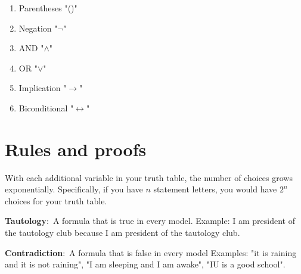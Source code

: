 \documentclass[nobib]{tufte-handout}
\newcommand{\defn}[2]{\noindent\textbf{#1}:\ #2}
\let\biconditional\leftrightarrow
\begin{document}
\begin{enumerate}
    \item Parentheses "()"
    \item Negation "$\neg$"
    \item AND "$\land$"
    \item OR "$\lor$"
    \item Implication "$\rightarrow$"
    \item Biconditional "$\biconditional$"
\end{enumerate}

\section{Rules and proofs}

With each additional variable in your truth table, the number
of choices grows exponentially. Specifically, if you have $n$ statement
letters, you would have $2^n$ choices for your truth table. 

\defn{Tautology}{A formula that is true in every model.} 
Example: I am president of the tautology club because 
I am president of the tautology club. 

\defn{Contradiction}{A formula that is false in every model} Examples:
"it is raining and it is not raining", "I am sleeping and I am awake", 
"IU is a good school". 

\end{document}
